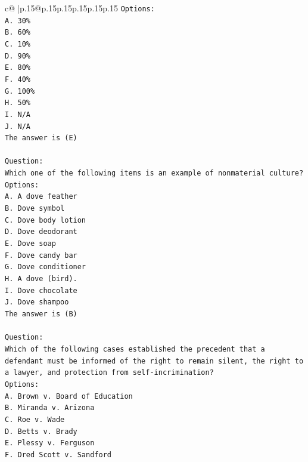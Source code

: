 \documentclass{article}
\begin{document}
{\begin{supertabular}{c@{$\;$}|p{.15\linewidth}@{}p{.15\linewidth}p{.15\linewidth}p{.15\linewidth}p{.15\linewidth}p{.15\linewidth}}
{{{\texttt{Options:} \\
\texttt{A. 30\%} \\
\texttt{B. 60\%} \\
\texttt{C. 10\%} \\
\texttt{D. 90\%} \\
\texttt{E. 80\%} \\
\texttt{F. 40\%} \\
\texttt{G. 100\%} \\
\texttt{H. 50\%} \\
\texttt{I. N/A} \\
\texttt{J. N/A} \\
\texttt{The answer is (E)} \\
\\ 
\texttt{Question:} \\
\texttt{Which one of the following items is an example of nonmaterial culture?} \\
\texttt{Options:} \\
\texttt{A. A dove feather} \\
\texttt{B. Dove symbol} \\
\texttt{C. Dove body lotion} \\
\texttt{D. Dove deodorant} \\
\texttt{E. Dove soap} \\
\texttt{F. Dove candy bar} \\
\texttt{G. Dove conditioner} \\
\texttt{H. A dove (bird).} \\
\texttt{I. Dove chocolate} \\
\texttt{J. Dove shampoo} \\
\texttt{The answer is (B)} \\
\\ 
\texttt{Question:} \\
\texttt{Which of the following cases established the precedent that a defendant must be informed of the right to remain silent, the right to a lawyer, and protection from self{-}incrimination?} \\
\texttt{Options:} \\
\texttt{A. Brown v. Board of Education} \\
\texttt{B. Miranda v. Arizona} \\
\texttt{C. Roe v. Wade} \\
\texttt{D. Betts v. Brady} \\
\texttt{E. Plessy v. Ferguson} \\
\texttt{F. Dred Scott v. Sandford} \\
}}}
\end{supertabular}}
\end{document}
